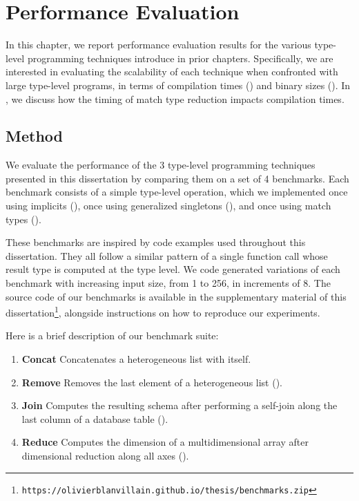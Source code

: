 

\chapter{Performance Evaluation}
\label{chap:performance-evaluation}

In this chapter, we report performance evaluation results for the various type-level programming techniques introduce in prior chapters.
Specifically, we are interested in evaluating the scalability of each technique when confronted with large type-level programs, in terms of compilation times () and binary sizes ().
In , we discuss how the timing of match type reduction impacts compilation times.

\section{Method}

We evaluate the performance of the 3 type-level programming techniques presented in this dissertation by comparing them on a set of 4 benchmarks.
Each benchmark consists of a simple type-level operation, which we implemented once using implicits (), once using generalized singletons (), and once using match types ().

These benchmarks are inspired by code examples used throughout this dissertation. They all follow a similar pattern of a single function call whose result type is computed at the type level. We code generated variations of each benchmark with increasing input size, from 1 to 256, in increments of 8.
The source code of our benchmarks is available in the supplementary material of this dissertation\footnote{\texttt{https://olivierblanvillain.github.io/thesis/benchmarks.zip}}, alongside instructions on how to reproduce our experiments.

Here is a brief description of our benchmark suite:

\begin{enumerate}
  \item \textbf{Concat}\quad
  Concatenates a heterogeneous list with itself.

  \item \textbf{Remove}\quad
  Removes the last element of a heterogeneous list ().

  \item \textbf{Join}\quad
  Computes the resulting schema after performing a self-join along the last column of a database table ().

  \item \textbf{Reduce}\quad
  Computes the dimension of a multidimensional array after dimensional reduction along all axes ().
\end{enumerate}

